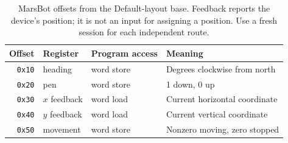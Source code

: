 \begin{table}[htbp]
  \centering
  \small
  \begin{tabular}{rlll}
    \toprule
    Offset        & Register     & Program access & Meaning                       \\
    \midrule
    \texttt{0x10} & heading      & word store     & Degrees clockwise from north  \\
    \texttt{0x20} & pen          & word store     & 1 down, 0 up                  \\
    \texttt{0x30} & $x$ feedback & word load      & Current horizontal coordinate \\
    \texttt{0x40} & $y$ feedback & word load      & Current vertical coordinate   \\
    \texttt{0x50} & movement     & word store     & Nonzero moving, zero stopped  \\
    \bottomrule
  \end{tabular}
  \caption{MarsBot offsets from the Default-layout base. Feedback reports the device's position; it is not an input for assigning a position. Use a fresh session for each independent route.}
  \label{tab:revision-marsbot-ports}
\end{table}
